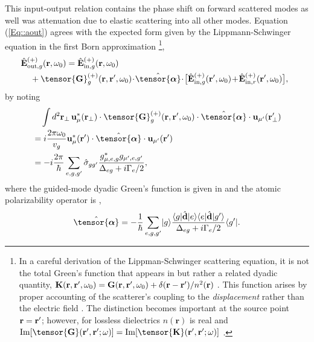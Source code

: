 \documentclass[aps,pra,twocolumn]{revtex4-1} %
\newcommand{\inp}{{\rm in}}
\newcommand{\out}{{\rm out}}
\newcommand{\poltens}{\hat{\tensor{\boldsymbol{\alpha}}}}
\begin{document}
This input-output relation contains the phase shift on forward scattered modes as well was attenuation due to elastic scattering into all other modes.
Equation (\ref{Eq::aout}) agrees with the expected form given by the Lippmann-Schwinger equation in the first Born approximation \footnote{In a careful derivation of the Lippman-Schwinger scattering equation, it is not the total Green's function that appears in  but rather a related dyadic quantity, $\mathbf{K}(\mathbf{r},\mathbf{r}', \omega_0) = \mathbf{G}(\mathbf{r},\mathbf{r}', \omega_0) + \delta(\mathbf{r}-\mathbf{r}')/n^2(\mathbf{r})$ \cite{wubs_multiple-scattering_2004}. 
This function arises by proper accounting of the scatterer's coupling to the \emph{displacement} rather than the electric field \cite{yao_ultrahigh_2009}.  The distinction becomes important at the source point $\mathbf{r} = \mathbf{r}'$; however, for lossless dielectrics $n(\mathbf{r})$ is real and ${\rm Im}[\tensor{\mathbf{G}}(\br',\br'; \omega)] = {\rm Im}[\tensor{\mathbf{K}}(\br',\br'; \omega)]$ \cite{yao_-chip_2010}. },
	\begin{align} \label{Eq::IOScatteredField}
		\!\!\!\hat{\mathbf{E}}^{(+)}_{\out,g}&(\br, \omega_0)=\hat{\mathbf{E}}^{(+)}_{ \inp, g}(\br, \omega_0)\nn\\
		&\!\!\!\!\!\!\!\!\!+\tensor{\mathbf{G}}_g^{(+)}(\br,\br',\omega_0)\!\cdot\! \poltens \!\cdot\! \big[\hat{\mathbf{E}}^{(+)}_{\inp, g}(\br', \omega_0)\!+\!\hat{\mathbf{E}}^{(+)}_{\inp,r}(\br', \omega_0) \big],
	\end{align}
by noting
	\begin{align}
		&\quad\int d^2 \mbf{r}_\perp \, \mathbf{u}^*_{\mu} (\br_\perp)\cdot \tensor{\mathbf{G}}_g^{(+)}(\br,\br',\omega_0)\cdot \poltens \cdot \mathbf{u}_{\mu'} (\br'_\perp) \nn\\
		&= i \frac{ 2\pi \omega_0}{v_g} \mathbf{u}^*_\mu (\br') \cdot \poltens \cdot \mathbf{u}_{\mu'} (\br') \\
		& = - i \frac{2 \pi}{\hbar} \sum_{e,g,g'}  \hat{\sigma}_{gg'} \frac{g_{\mu,e,g}^* g_{\mu',e,g'}}{ \Delta_{eg} + i \Gamma_{e}/2 }, 
	\end{align}
where the guided-mode dyadic Green's function is given in  and the atomic polarizability operator is \cite{buhmann_casimir-polder_2004, deutsch_quantum_2010,kien_dynamical_2013},
	\begin{equation} \label{Eq::PolarizabilityOperator}
		\poltens = - \frac{1}{\hbar} \sum_{e,g,g'}\ket{g}\frac{\bra{g}\hat{\mathbf{d}}\ket{e}\bra{e} 
\hat{\mathbf{d}}\ket{g'}}{\Delta_{eg} + i \Gamma_{e}/2 }\bra{g'}.
	\end{equation}	
\end{document}
